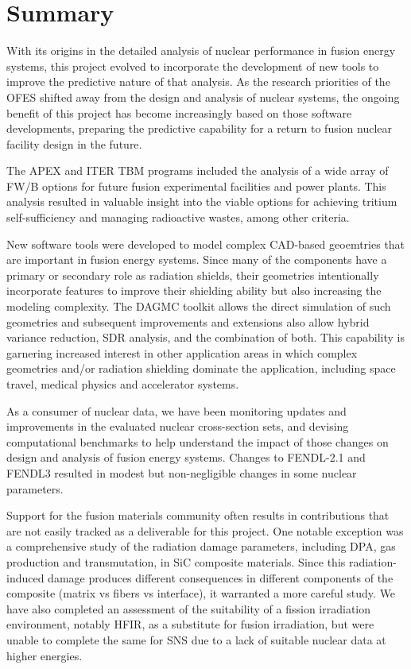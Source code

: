 \chapter{Summary}

With its origins in the detailed analysis of nuclear performance in fusion
energy systems, this project evolved to incorporate the development of new
tools to improve the predictive nature of that analysis.  As the research
priorities of the \gls{OFES} shifted away from the design and analysis of
nuclear systems, the ongoing benefit of this project has become increasingly
based on those software developments, preparing the predictive capability for
a return to fusion nuclear facility design in the future.

The \gls{APEX} and ITER \gls{TBM} programs included the analysis of a wide
array of \gls{FW/B} options for future fusion experimental facilities and
power plants.  This analysis resulted in valuable insight into the viable
options for achieving tritium self-sufficiency and managing radioactive
wastes, among other criteria.

New software tools were developed to model complex \gls{CAD}-based geoemtries
that are important in fusion energy systems.  Since many of the components
have a primary or secondary role as radiation shields, their geometries
intentionally incorporate features to improve their shielding ability but also
increasing the modeling complexity.  The \gls{DAGMC} toolkit allows the direct
simulation of such geometries and subsequent improvements and extensions also
allow hybrid variance reduction, \gls{SDR} analysis, and the combination of
both.  This capability is garnering increased interest in other application
areas in which complex geometries and/or radiation shielding dominate the
application, including space travel, medical physics and accelerator systems.

As a consumer of nuclear data, we have been monitoring updates and
improvements in the evaluated nuclear cross-section sets, and devising
computational benchmarks to help understand the impact of those changes on
design and analysis of fusion energy systems.  Changes to \gls{FENDL}-2.1 and
\gls{FENDL}3 resulted in modest but non-negligible changes in some nuclear
parameters.

Support for the fusion materials community often results in contributions that
are not easily tracked as a deliverable for this project.  One notable
exception was a comprehensive study of the radiation damage parameters,
including DPA, gas production and transmutation, in SiC composite
materials.  Since this radiation-induced damage produces different
consequences in different components of the composite (matrix vs fibers vs
interface), it warranted a more careful study.  We have also completed an
assessment of the suitability of a fission irradiation environment, notably
\gls{HFIR}, as a substitute for fusion irradiation, but were unable to
complete the same for \gls{SNS} due to a lack of suitable nuclear data at
higher energies.


